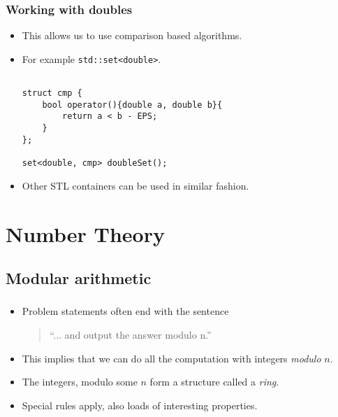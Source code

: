 \documentclass[10pt]{beamer}
\newcommand{\bi}{\begin{itemize}}
\newcommand{\ei}{\end{itemize}}
\begin{document}
\begin{frame}[fragile]
  \frametitle{Working with doubles}
  \vspace{30pt}
  \bi
    \item This allows us to use comparison based algorithms.
    \item For example \texttt{std::set<double>}.
      \begin{verbatim}

struct cmp {
    bool operator(){double a, double b}{
        return a < b - EPS;
    }
};

set<double, cmp> doubleSet();
      \end{verbatim}
    \item Other STL containers can be used in similar fashion.
  \ei
\end{frame}


\section{Number Theory}
\subsection{Modular arithmetic}
\begin{frame}[fragile]
  \frametitle{\insertsubsection}
  \vspace{30pt}
  \bi
    \item Problem statements often end with the sentence \\
      \vspace{10pt}
      \begin{quote}
``... and output the answer modulo n.''
      \end{quote}
      \vspace{10pt}
    \item This implies that we can do all the computation with integers \emph{modulo }$n$.
    \item The integers, modulo some $n$ form a structure called a \emph{ring}.
    \item Special rules apply, also loads of interesting properties.
  \ei
\end{frame}
\end{document}

